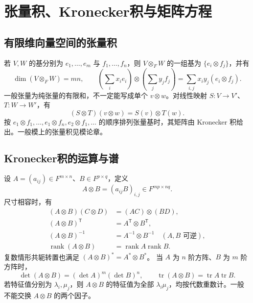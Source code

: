 \documentclass[../main.tex]{subfiles}
\begin{document}
\section{张量积、Kronecker积与矩阵方程}
\subsection{有限维向量空间的张量积}
若 $V,W$ 的基分别为 $e_1,\ldots,e_m$ 与 $f_1,\ldots,f_n$，则 $V\otimes_FW$ 的一组基为 $\{e_i\otimes f_j\}$，并有
\[
\dim(V\otimes_FW)=mn,\qquad
\left(\sum_i x_ie_i\right)\otimes\left(\sum_jy_jf_j\right)
=\sum_{i,j}x_iy_j(e_i\otimes f_j).
\]
一般张量为纯张量的有限和，不一定能写成单个 $v\otimes w$。对线性映射 $S:V\to V'$、$T:W\to W'$，有
\[
(S\otimes T)(v\otimes w)=S(v)\otimes T(w).
\]
按 $e_1\otimes f_1,\ldots,e_1\otimes f_n,e_2\otimes f_1,\ldots$ 的顺序排列张量基时，其矩阵由 Kronecker 积给出。一般模上的张量积见模论章。
\subsection{Kronecker积的运算与谱}
设 $A=(a_{ij})\in F^{m\times n}$、$B\in F^{p\times q}$，定义
\[
A\otimes B=(a_{ij}B)_{i,j}\in F^{mp\times nq}.
\]
尺寸相容时，有
\begin{align*}
(A\otimes B)(C\otimes D)&=(AC)\otimes(BD),\\
(A\otimes B)^{\mathsf T}&=A^{\mathsf T}\otimes B^{\mathsf T},\\
(A\otimes B)^{-1}&=A^{-1}\otimes B^{-1}\quad(A,B\text{ 可逆}),\\
\operatorname{rank}(A\otimes B)&=\operatorname{rank}A\operatorname{rank}B.
\end{align*}
复数情形共轭转置也满足 $(A\otimes B)^*=A^*\otimes B^*$。
当 $A$ 为 $n$ 阶方阵、$B$ 为 $m$ 阶方阵时，
\[
\det(A\otimes B)=(\det A)^m(\det B)^n,\qquad
\operatorname{tr}(A\otimes B)=\operatorname{tr}A\operatorname{tr}B.
\]
若特征值分别为 $\lambda_i,\mu_j$，则 $A\otimes B$ 的特征值为全部 $\lambda_i\mu_j$，均按代数重数计。一般不能交换 $A\otimes B$ 的两个因子。
\end{document}
